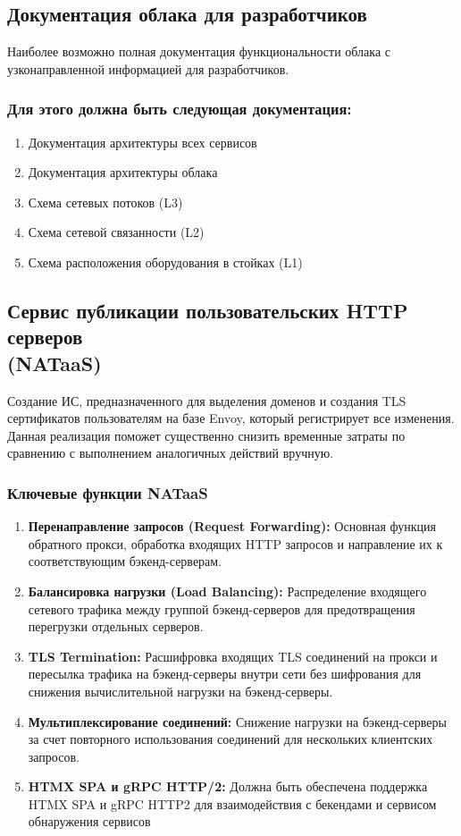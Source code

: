 \documentclass[14pt, a4paper]{extarticle}
\begin{document}
\subsection{Документация облака для разработчиков}

Наиболее возможно полная документация функциональности облака с узконаправленной информацией для разработчиков.

\subsubsection*{Для этого должна быть следующая документация:}

\begin{enumerate}
\item Документация архитектуры всех сервисов
\item Документация архитектуры облака
\item Схема сетевых потоков (L3)
\item Схема сетевой связанности (L2)
\item Схема расположения оборудования в стойках (L1)
\end{enumerate}

\subsection{Сервис публикации пользовательских HTTP серверов \\(NATaaS)}

Создание ИС, предназначенного для выделения доменов и создания TLS сертификатов пользователям на базе Envoy, который регистрирует все изменения. Данная реализация  поможет существенно снизить временные затраты по сравнению с выполнением аналогичных действий вручную.

\subsubsection*{Ключевые функции NATaaS}

\begin{enumerate}
\item \textbf{Перенаправление запросов (Request Forwarding):} Основная функция обратного прокси, обработка входящих HTTP запросов и направление их к соответствующим бэкенд-серверам.
\item \textbf{Балансировка нагрузки (Load Balancing):} Распределение входящего сетевого трафика между группой бэкенд-серверов для предотвращения перегрузки отдельных серверов.
\item \textbf{TLS Termination:} Расшифровка входящих TLS соединений на прокси и пересылка трафика на бэкенд-серверы внутри сети без шифрования для снижения вычислительной нагрузки на бэкенд-серверы.
\item \textbf{Мультиплексирование соединений:} Снижение нагрузки на бэкенд-серверы за счет повторного использования соединений для нескольких клиентских запросов.
\item \textbf{HTMX SPA и gRPC HTTP/2:} Должна быть обеспечена поддержка HTMX SPA и gRPC HTTP2 для взаимодействия с бекендами и сервисом обнаружения сервисов
\end{enumerate}
\end{document}
